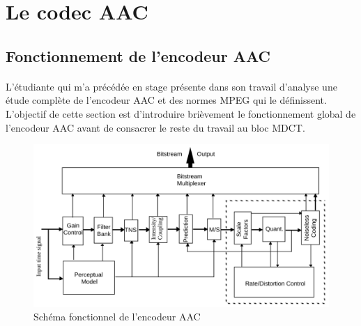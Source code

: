 \documentclass{article}
\begin{document}
    \newpage
    \section{Le codec AAC}
    \label{sec:AAC}
    \subsection{Fonctionnement de l'encodeur AAC}
    \paragraph{}
    L'étudiante qui m'a précédée en stage présente dans son travail d'analyse une étude complète de l'encodeur AAC et des normes MPEG qui le définissent\cite{Wafaa}. L'objectif de cette section est d'introduire brièvement le fonctionnement global de l'encodeur AAC avant de consacrer le reste du travail au bloc MDCT.

    \begin{figure}[H]
        \centering
        \includegraphics[width=.7\linewidth]{./images/block-diagram-aac.png}
        \caption{Schéma fonctionnel de l'encodeur AAC}
        \label{fig:bloc-diagram-aac}
    \end{figure}
\end{document}
